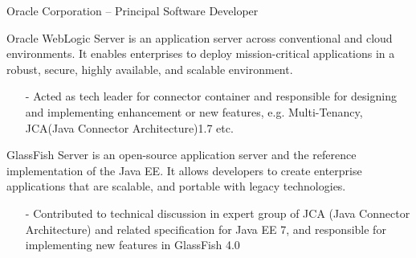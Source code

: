 \documentclass[10pt,a4paper]{moderncv}
\begin{document}
{ Oracle Corporation -- Principal Software Developer}{}{}{}{}
\vspace{1ex}
{
  Oracle WebLogic Server is an application server across conventional and cloud environments. It enables enterprises to deploy mission-critical applications in a robust, secure, highly available, and scalable environment.
  \begin{itemize}
    \item[-] Acted as tech leader for connector container and responsible for designing and implementing enhancement or
               new features, e.g. Multi-Tenancy, JCA(Java Connector Architecture)1.7 etc.
  \end{itemize}
}
\vspace*{0.4\baselineskip}

\vspace*{0.2\baselineskip}
{
  GlassFish Server is an open-source application server  and the reference implementation of the Java EE. It allows developers to create enterprise
  applications that are scalable, and portable with legacy technologies.
  \begin{itemize}
    \item[-]Contributed to technical discussion in expert group of JCA (Java Connector Architecture) and related specification for Java EE 7, and responsible for implementing new features in GlassFish 4.0
  \end{itemize}
}

\vspace{2ex}
\vspace*{0.4\baselineskip}
\end{document}
